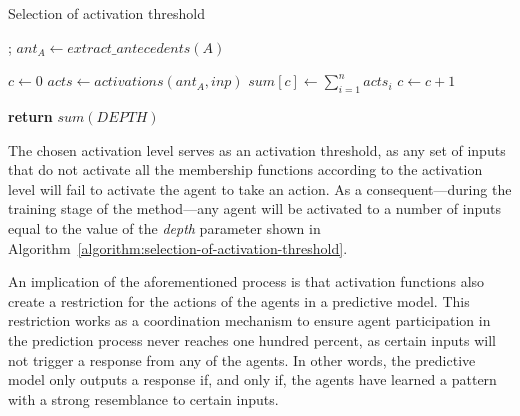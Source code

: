 ﻿\documentclass{ieeeaccess}
\begin{document}
\begin{algorithm}
  \caption{Selection of activation threshold}
  \label{algorithm:selection-of-activation-threshold}
  \begin{algorithmic}[1]
    ;
    \State $ant_A\gets extract\_antecedents(A)$

    \State $c\gets 0$
    \State $acts \gets activations(ant_A, inp)$
    \State $sum[c] \gets \sum_{i = 1}^{n} acts_i$
    \State $c \gets c + 1$
    \EndFor

    \State \textbf{return} $sum(DEPTH)$
    \EndProcedure
  \end{algorithmic}
\end{algorithm}


The chosen activation level serves as an activation threshold, as any set of
inputs that do not activate all the membership functions according to the
activation level will fail to activate the agent to take an action. As a
consequent---during the training stage of the method---any agent will be
activated to a number of inputs equal to the value of the \textit{depth}
parameter shown in Algorithm~\ref{algorithm:selection-of-activation-threshold}.

An implication of the aforementioned process is that activation functions also
create a restriction for the actions of the agents in a predictive model. This
restriction works as a coordination mechanism to ensure agent participation in
the prediction process never reaches one hundred percent, as certain 
inputs will not trigger a response from any of the agents. In other words, the
predictive model only outputs a response if, and only if, the agents have learned
a pattern with a strong resemblance to certain inputs.
\end{document}
